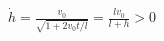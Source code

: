 \documentclass[border=2.5pt]{standalone}
\begin{document}
$\displaystyle \dot h=\frac{v_0}{\sqrt{1+2v_0t/l}} =\frac{l v_0}{l+h}>0$
\end{document}
